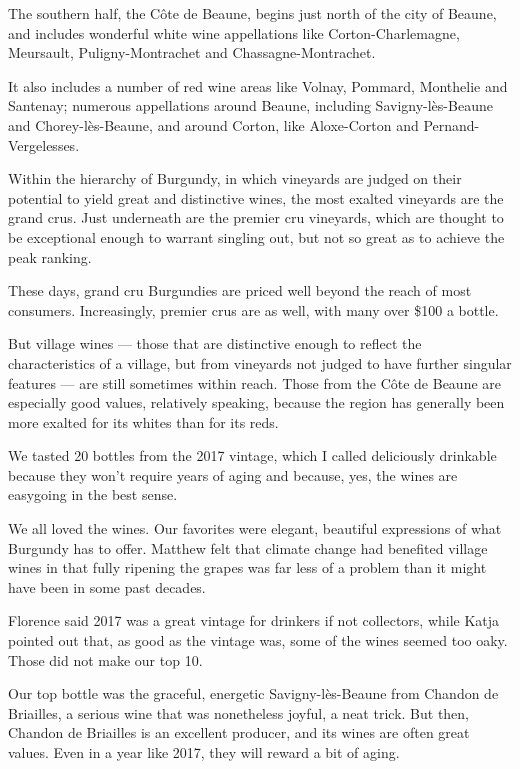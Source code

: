 The southern half, the Côte de Beaune, begins just north of the city of
Beaune, and includes wonderful white wine appellations like
Corton-Charlemagne, Meursault, Puligny-Montrachet and
Chassagne-Montrachet.

It also includes a number of red wine areas like Volnay, Pommard,
Monthelie and Santenay; numerous appellations around Beaune, including
Savigny-lès-Beaune and Chorey-lès-Beaune, and around Corton, like
Aloxe-Corton and Pernand-Vergelesses.

Within the hierarchy of Burgundy, in which vineyards are judged on their
potential to yield great and distinctive wines, the most exalted
vineyards are the grand crus. Just underneath are the premier cru
vineyards, which are thought to be exceptional enough to warrant
singling out, but not so great as to achieve the peak ranking.

These days, grand cru Burgundies are priced well beyond the reach of
most consumers. Increasingly, premier crus are as well, with many over
\$100 a bottle.

But village wines --- those that are distinctive enough to reflect the
characteristics of a village, but from vineyards not judged to have
further singular features --- are still sometimes within reach. Those
from the Côte de Beaune are especially good values, relatively speaking,
because the region has generally been more exalted for its whites than
for its reds.

We tasted 20 bottles from the 2017 vintage, which I called deliciously
drinkable because they won't require years of aging and because, yes,
the wines are easygoing in the best sense.

We all loved the wines. Our favorites were elegant, beautiful
expressions of what Burgundy has to offer. Matthew felt that climate
change had benefited village wines in that fully ripening the grapes was
far less of a problem than it might have been in some past decades.

Florence said 2017 was a great vintage for drinkers if not collectors,
while Katja pointed out that, as good as the vintage was, some of the
wines seemed too oaky. Those did not make our top 10.

Our top bottle was the graceful, energetic Savigny-lès-Beaune from
Chandon de Briailles, a serious wine that was nonetheless joyful, a neat
trick. But then, Chandon de Briailles is an excellent producer, and its
wines are often great values. Even in a year like 2017, they will reward
a bit of aging.

